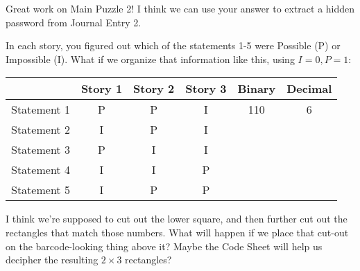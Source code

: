 Great work on Main Puzzle 2! I think we can use your answer
to extract a hidden password from Journal Entry 2.

In each story, you figured out which of the statements 1-5 were Possible (P)
or Impossible (I). What if we organize that information like this,
using \(I=0,P=1\):

\begin{center}
\begin{tabular}{c|ccc|cc}
& Story 1 & Story 2 & Story 3 & Binary & Decimal \\\hline
Statement 1 & P & P & I & 110 & 6 \\
Statement 2 & I & P & I \\ %
Statement 3 & P & I & I \\ %
Statement 4 & I & I & P \\ %
Statement 5 & I & P & P %
\end{tabular}
\end{center}

I think we're supposed to cut out the lower square, and then further
cut out the rectangles that match those numbers. What will happen
if we place that cut-out on the barcode-looking thing above it?
Maybe the Code Sheet will help us decipher the resulting \(2\times 3\)
rectangles?
